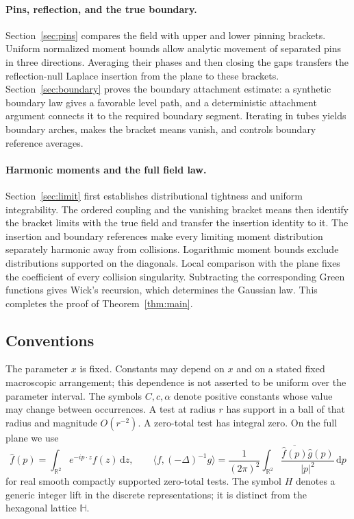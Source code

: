\documentclass[11pt]{article}
\theoremstyle{definition}
\theoremstyle{remark}
\numberwithin{equation}{section}
\begin{document}
\paragraph{Pins, reflection, and the true boundary.}
Section~\ref{sec:pins} compares the field with upper and lower pinning
brackets.  Uniform normalized moment bounds allow analytic movement of
separated pins in three directions.  Averaging their phases and then
closing the gaps transfers the reflection-null Laplace insertion from
the plane to these brackets.  Section~\ref{sec:boundary} proves the
boundary attachment estimate: a synthetic boundary law gives a favorable
level path, and a deterministic attachment argument connects it to the
required boundary segment.  Iterating in tubes yields boundary arches,
makes the bracket means vanish, and controls boundary reference averages.

\paragraph{Harmonic moments and the full field law.}
Section~\ref{sec:limit} first establishes distributional tightness and
uniform integrability.  The ordered coupling and the vanishing bracket
means then identify the bracket limits with the true field and transfer
the insertion identity to it.  The insertion and boundary references
make every limiting moment distribution separately harmonic away from
collisions.  Logarithmic moment bounds exclude distributions supported
on the diagonals.  Local comparison with the plane fixes the coefficient
of every collision singularity.  Subtracting the corresponding Green
functions gives Wick's recursion, which determines the Gaussian law.
This completes the proof of Theorem~\ref{thm:main}.

\subsection{Conventions}

The parameter $x$ is fixed.  Constants may depend on $x$ and on a stated
fixed macroscopic arrangement; this dependence is not asserted to be
uniform over the parameter interval.  The symbols $C,c,\alpha$ denote
positive constants whose value may change between occurrences.  A test
at radius $r$ has support in a ball of that radius and magnitude
$O(r^{-2})$.  A zero-total test has integral zero.  On the full plane we
use
\[
 \widehat f(p)=\int_{\mathbb R^2}e^{-ip\cdot z}f(z)\,\mathrm d z,
 \qquad
 \langle f,(-\Delta)^{-1}g\rangle
 =\frac1{(2\pi)^2}\int_{\mathbb R^2}
       \frac{\overline{\widehat f(p)}\widehat g(p)}{|p|^2}\,\mathrm d p
\]
for real smooth compactly supported zero-total tests.  The symbol $H$
denotes a generic integer lift in the discrete representations; it is
distinct from the hexagonal lattice $\mathbb H$.
\end{document}
